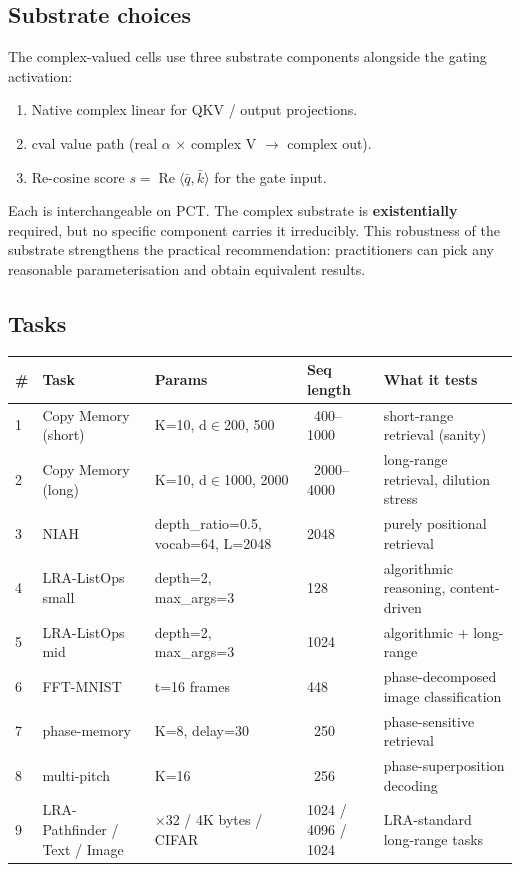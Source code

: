 \documentclass[11pt,a4paper]{article}
\theoremstyle{plain}
\theoremstyle{definition}
\renewcommand{\Re}{\operatorname{Re}}
\begin{document}
\subsection{Substrate choices}
The complex-valued cells use three substrate components alongside the gating activation:

\begin{enumerate}
  \item Native complex linear for QKV / output projections.
  \item cval value path (real $\alpha$ $\times$ complex V $\to$ complex out).
  \item Re-cosine score $s = \Re \langle \bar{q}, \bar{k}\rangle $ for the gate input.
\end{enumerate}

Each is interchangeable on PCT. The complex substrate is \textbf{existentially} required, but no specific component carries it irreducibly. This robustness of the substrate strengthens the practical recommendation: practitioners can pick any reasonable parameterisation and obtain equivalent results.

\subsection{Tasks}
\begin{table}[H]
\centering
\footnotesize
\setlength{\tabcolsep}{4pt}
\renewcommand{\arraystretch}{1.1}
\begin{tabularx}{\textwidth}{|l|>{\raggedright\arraybackslash}X|>{\raggedright\arraybackslash}X|l|>{\raggedright\arraybackslash}X|}
\hline
\# & Task & Params & Seq length & What it tests \\
\hline
1 & Copy Memory (short) & K=10, d$\in${200, 500} & ~400--1000 & short-range retrieval (sanity) \\
\hline
2 & Copy Memory (long) & K=10, d$\in${1000, 2000} & ~2000--4000 & long-range retrieval, dilution stress \\
\hline
3 & NIAH & depth\_ratio=0.5, vocab=64, L=2048 & 2048 & purely positional retrieval \\
\hline
4 & LRA-ListOps small & depth=2, max\_args=3 & 128 & algorithmic reasoning, content-driven \\
\hline
5 & LRA-ListOps mid & depth=2, max\_args=3 & 1024 & algorithmic + long-range \\
\hline
6 & FFT-MNIST & t=16 frames & 448 & phase-decomposed image classification \\
\hline
7 & phase-memory & K=8, delay=30 & ~250 & phase-sensitive retrieval \\
\hline
8 & multi-pitch & K=16 & ~256 & phase-superposition decoding \\
\hline
9 & LRA-Pathfinder / Text / Image & 32$\times$32 / 4K bytes / CIFAR & 1024 / 4096 / 1024 & LRA-standard long-range tasks \\
\hline
\end{tabularx}
\end{table}
\end{document}
